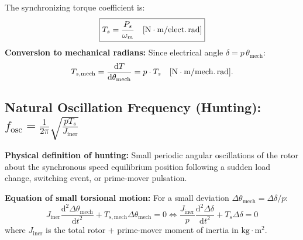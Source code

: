 The synchronizing torque coefficient is:
\begin{equation}
\boxed{T_s = \frac{P_s}{\omega_m} \quad [\mathrm{N\cdot m/\text{elect.\,rad}}]}
\end{equation}
\textbf{Conversion to mechanical radians:}
Since electrical angle $\delta = p\,\theta_{\mathrm{mech}}$:
\begin{equation}
T_{s,\mathrm{mech}} = \frac{\mathrm{d}T}{\mathrm{d}\theta_{\mathrm{mech}}} = p\cdot T_s \quad [\mathrm{N\cdot m/\text{mech.\,rad}}].
\end{equation}

\subsection{Natural Oscillation Frequency (Hunting): \texorpdfstring{$f_{\mathrm{osc}} = \frac{1}{2\pi}\sqrt{\frac{p T_s}{J_{\mathrm{iner}}}}$}{f(osc) = 1/(2pi) sqrt(p Ts / J)}}
\textbf{Physical definition of hunting:} Small periodic angular oscillations of the rotor about the synchronous speed equilibrium position following a sudden load change, switching event, or prime-mover pulsation.

\textbf{Equation of small torsional motion:}
For a small deviation $\Delta\theta_{\mathrm{mech}} = \Delta\delta / p$:
\begin{equation}
J_{\mathrm{iner}}\frac{\mathrm{d}^2\Delta\theta_{\mathrm{mech}}}{\mathrm{d}t^2} + T_{s,\mathrm{mech}}\Delta\theta_{\mathrm{mech}} = 0 \iff \frac{J_{\mathrm{iner}}}{p}\frac{\mathrm{d}^2\Delta\delta}{\mathrm{d}t^2} + T_s\Delta\delta = 0
\end{equation}
where $J_{\mathrm{iner}}$ is the total rotor + prime-mover moment of inertia in $\mathrm{kg\cdot m^2}$.

